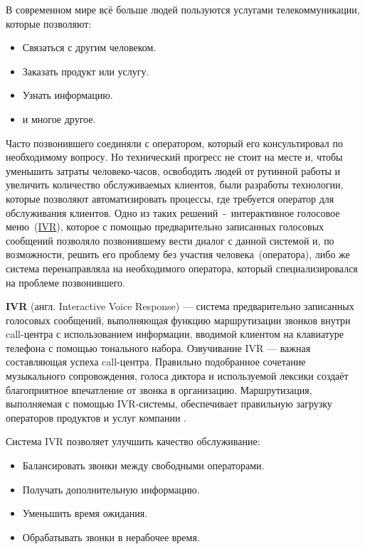 
В современном мире всё больше людей пользуются услугами телекоммуникации, которые
позволяют:
\begin{itemize}
    \item Связаться с другим человеком.
    \item Заказать продукт или услугу.
    \item Узнать информацию.
    \item и многое другое.
\end{itemize}

Часто позвонившего соединяли с оператором, который его консультировал по необходимому
вопросу. Но технический прогресс не стоит на месте и, чтобы уменьшить
затраты человеко-часов, освободить людей от рутинной работы и увеличить
количество обслуживаемых клиентов, были разработы технологии, которые позволяют
автоматизировать процессы, где требуется оператор для обслуживания клиентов.
Одно из таких решений~-~интерактивное голосовое меню~(\hyperlink{ivr}{IVR}),
которое с помощью предварительно записанных голосовых сообщений позволяло
позвонившему вести диалог с данной системой и, по возможности, решить его проблему
без участия человека~(оператора), либо же система перенаправляла на необходимого
оператора, который специализировался на проблеме позвонившего.

\textbf{IVR} (англ. Interactive Voice Response) — система предварительно записанных
голосовых сообщений, выполняющая функцию маршрутизации звонков внутри call-центра
с использованием информации, вводимой клиентом на клавиатуре телефона с помощью
тонального набора. Озвучивание IVR — важная составляющая успеха call-центра.
Правильно подобранное сочетание музыкального сопровождения, голоса диктора и
используемой лексики создаёт благоприятное впечатление от звонка в организацию.
Маршрутизация, выполняемая с помощью IVR-системы, обеспечивает правильную загрузку
операторов продуктов и услуг компании \cite{ivr}.

Система IVR позволяет улучшить качество обслуживание:
\begin{itemize}
    \item Балансировать звонки между свободными операторами.
    \item Получать дополнительную информацию.
    \item Уменьшить время ожидания.
    \item Обрабатывать звонки в нерабочее время.
\end{itemize}

